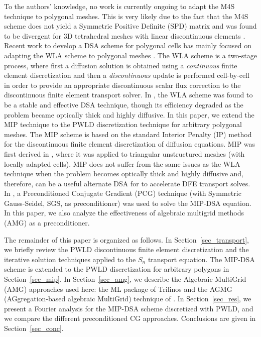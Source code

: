 \documentclass[preprint,10pt]{elsarticle}
\renewcommand{\(}{\left(}
\renewcommand{\)}{\right)}
\renewcommand{\[}{\left[}
\renewcommand{\]}{\right]}
\newcommand{\sn}{\ensuremath{S_n}\xspace}
\begin{document}
To the authors' knowledge, no work is currently ongoing to adapt the M4S 
technique to polygonal meshes. This is very likely due to the fact
that the M4S scheme does not yield a Symmetric Positive Definite (SPD)
matrix and was found to be divergent for 3D tetrahedral meshes with linear 
discontinuous elements \cite{consistent_p1}. 
% 
Recent work to develop a DSA scheme for polygonal cells has mainly focused 
on adapting the WLA scheme to polygonal meshes
\cite{cfm_dfm,wla_pwl}. The WLA scheme is a two-stage process, where first a
diffusion solution is obtained using a {\em continuous} finite element
discretization and then a {\em discontinuous} update is performed cell-by-cell 
in order to provide an appropriate discontinuous scalar flux correction to 
the discontinuous finite element transport 
solver. In \cite{consistent_p1}, the WLA scheme was
found to be a stable and effective DSA technique, though its efficiency
degraded as the problem became optically thick and highly diffusive.
%
In this paper, we extend the MIP technique to the
PWLD discretization technique for arbitrary polygonal meshes.
The MIP scheme is based on the standard Interior Penalty (IP) method for the
discontinuous finite element discretization of diffusion equations. MIP was first derived in
\cite{mip}, where it was applied to triangular unstructured meshes (with
locally adapted cells). MIP does not suffer from the same issues as the WLA technique when the
problem becomes optically thick and highly diffusive and, therefore, can be a
useful alternate DSA for to accelerate DFE transport solves. 
In \cite{mip}, a Preconditioned Conjugate Gradient (PCG) technique (with Symmetric Gauss-Seidel, 
SGS, as preconditioner) was used to solve the MIP-DSA equation. In this paper, we also analyze  
the effectiveness of algebraic multigrid methods (AMG) \cite{amg,amg_course} as a preconditioner. 

The remainder of this paper is organized as follows. In Section~\ref {sec_transport},
we briefly review the PWLD discontinuous finite element discretization 
and the iterative solution techniques applied to the 
\sn transport equation. 
The MIP-DSA scheme is extended to the PWLD discretization for arbitrary 
polygons in Section~\ref {sec_mip}. In Section~\ref {sec_amg}, we describe the Algebraic MultiGrid (AMG) 
approaches used here: the ML package of Trilinos \cite{ml_guide} and the
AGMG (AGgregation-based algebraic MultiGrid) technique of 
\cite{agmg_guide,agmg,agmg2,agmg3}. In
Section~\ref {sec_res}, we present a Fourier analysis for the MIP-DSA scheme discretized with
PWLD, and we compare the different preconditioned CG approaches.
Conclusions are given in Section~\ref {sec_conc}.
\end{document}
